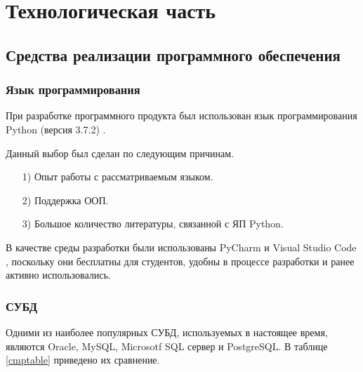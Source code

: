 \section{Технологическая часть}
	\subsection{Средства реализации программного обеспечения}
		\subsubsection{Язык программирования}
			При разработке программного продукта был использован язык программирования Python (версия 3.7.2) \cite{python}.
			
			Данный выбор был сделан по следующим причинам.
			\begin{enumerate}
				\item[1)] Опыт работы с рассматриваемым языком.
				\item[2)] Поддержка ООП.
				\item[3)] Большое количество литературы, связанной с ЯП Python.
			\end{enumerate}
		
			В качестве среды разработки были использованы PyCharm \cite{pycharm} и Visual Studio Code \cite{vcode}, поскольку они бесплатны для студентов, удобны в процессе разработки и ранее активно использовались.

		\subsubsection{СУБД}
		Одними из наиболее популярных СУБД, используемых в настоящее время, являются Oracle, MySQL, Microsotf SQL сервер и PostgreSQL. В таблице \ref{cmptable} приведено их сравнение.
		
